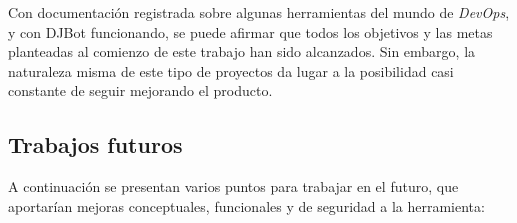 \documentclass[a4paper,12pt]{article}
\begin{document}
Con documentación registrada sobre algunas herramientas del mundo de \emph{DevOps}, y con DJBot funcionando, se puede afirmar que todos los objetivos y las metas planteadas al comienzo de este trabajo han sido alcanzados. Sin embargo, la naturaleza misma de este tipo de proyectos da lugar a la posibilidad casi constante de seguir mejorando el producto.\\

\subsection{Trabajos futuros}
\label{sec:orgheadline30}

A continuación se presentan varios puntos para trabajar en el futuro, que aportarían mejoras conceptuales, funcionales y de seguridad a la herramienta:\\
\end{document}
